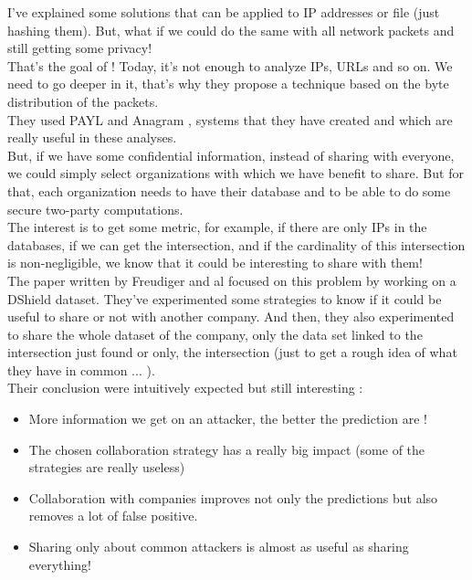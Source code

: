 \documentclass{eplmastersthesis}
\begin{document}
I've explained some solutions that can be applied to IP addresses or file (just hashing them). But, what if we could do the same with all network packets and still getting some privacy!\\
That's the goal of \cite{parekh2006privacy} ! Today, it's not enough to analyze IPs, URLs and so on. We need to go deeper in it, that's why they propose a technique based on the byte distribution of the packets.\\
They used PAYL and Anagram \cite{wang2006network}, systems that they have created and which are really useful in these analyses.\\

But, if we have some confidential information, instead of sharing with everyone, we could simply select organizations with which we have benefit to share. But for that, each organization needs to have their database and to be able to do some secure two-party computations.\\
The interest is to get some metric, for example, if there are only IPs in the databases, if we can get the intersection, and if the cardinality of this intersection is non-negligible, we know that it could be interesting to share with them!\\
The paper written by Freudiger and al \cite{freudiger2015controlled} focused on this problem by working on a DShield dataset. They've experimented some strategies to know if it could be useful to share or not with another company. And then, they also experimented to share the whole dataset of the company, only the data set linked to the intersection just found or only, the intersection (just to get a rough idea of what they have in common ... ).\\
Their conclusion were intuitively expected but still interesting :
\begin{itemize}
\item More information we get on an attacker, the better the prediction are !
\item The chosen collaboration strategy has a really big impact (some of the strategies are really useless)
\item Collaboration with companies improves not only the predictions but also removes a lot of false positive.
\item Sharing only about common attackers is almost as useful as sharing everything!
\end{itemize}
\end{document}
